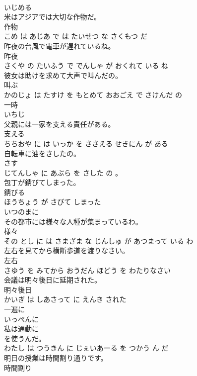 \documentclass[8pt]{extreport}
\begin{document}
\begin{CJK}{UTF8}{min}
\\	いじめる			
\\	米はアジアでは大切な作物だ。	
\\	作物 
\\	こめ は あじあ で は たいせつ な さくもつ だ			
\\	昨夜の台風で電車が遅れているね。	
\\	昨夜 
\\	さくや の たいふう で でんしゃ が おくれて いる ね			
\\	彼女は助けを求めて大声で叫んだの。	
\\	叫ぶ 
\\	かのじょ は たすけ を もとめて おおごえ で さけんだ の			
\\	一時	
\\	いちじ			
\\	父親には一家を支える責任がある。	
\\	支える 
\\	ちちおや に は いっか を ささえる せきにん が ある			
\\	自転車に油をさしたの。	
\\	さす 
\\	じてんしゃ に あぶら を さした の 。			
\\	包丁が錆びてしまった。	
\\	錆びる 
\\	ほうちょう が さびて しまった			
\\	いつのまに	
\\	その都市には様々な人種が集まっているわ。	
\\	様々 
\\	その とし に は さまざま な じんしゅ が あつまって いる わ			
\\	左右を見てから横断歩道を渡りなさい。	
\\	左右 
\\	さゆう を みてから おうだん ほどう を わたりなさい			
\\	会議は明々後日に延期された。	
\\	明々後日 
\\	かいぎ は しあさって に えんき された			
\\	一遍に	
\\	いっぺんに			
\\	私は通勤に
\\	を使うんだ。	
\\	わたし は つうきん に じぇいあーる を つかう ん だ			
\\	明日の授業は時間割り通りです。	
\\	時間割り 

\end{CJK}
\end{document}
